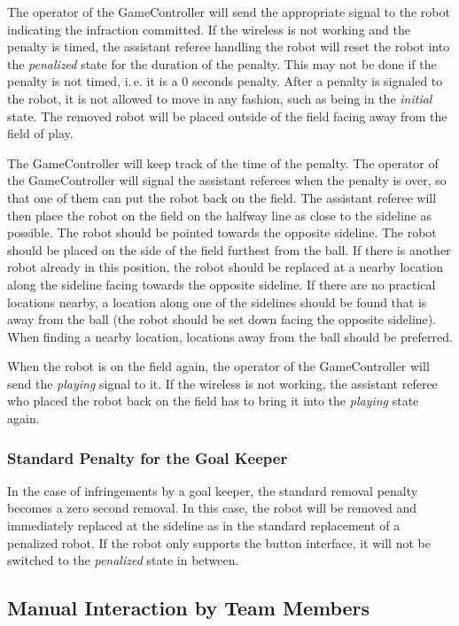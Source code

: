 \documentclass[12pt]{article}
\newcommand{\ie}{\mbox{i.\,e.}\xspace}
\begin{document}
The operator of the GameController will send the appropriate signal to the robot indicating the infraction committed. If the wireless is not working and the penalty is timed, the assistant referee handling the robot will reset the robot into the \emph{penalized} state for the duration of the penalty. This may not be done if the penalty is not timed, \ie it is a 0 seconds penalty. After a penalty is signaled to the robot, it is not allowed to move in any fashion, such as being in the \emph{initial} state. The removed robot will be placed outside of the field facing away from the field of play.

The GameController will keep track of the time of the penalty. The operator of the GameController will signal the assistant referees when the penalty is over, so that one of them can put the robot back on the field. The assistant referee will then place the robot on the field on the halfway line as close to the sideline as possible. The robot should be pointed towards the opposite sideline. The robot should be placed on the side of the field furthest from the ball. If there is another robot already in this position, the robot should be replaced at a nearby location along the sideline facing towards the opposite sideline. If there are no practical locations nearby, a location along one of the sidelines should be found that is away from the ball (the robot should be set down facing the opposite sideline). When finding a nearby location, locations away from the ball should be preferred.

When the robot is on the field again, the operator of the GameController will send the \emph{playing} signal to it. If the wireless is not working, the assistant referee who placed the robot back on the field has to bring it into the \emph{playing} state again.

\subsubsection{Standard Penalty for the Goal Keeper}
\label{sec:goal_keeper_standard_penalty}

In the case of infringements by a goal keeper, the standard removal penalty becomes a zero second removal. In this case, the robot will be removed and immediately replaced at the sideline as in the standard replacement of a penalized robot. If the robot only supports the button interface, it will not be switched to the \emph{penalized} state in between.

\subsection{Manual Interaction by Team Members}
\end{document}
